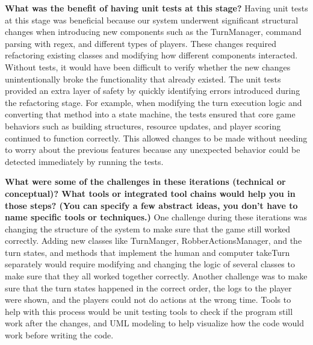 \textbf{What was the benefit of having unit tests at this stage?}
\newline\newline
Having unit tests at this stage was beneficial because our system underwent significant structural changes when introducing new components such as the TurnManager, command parsing with regex, and different types of players. These changes required refactoring existing classes and modifying how different components interacted. Without tests, it would have been difficult to verify whether the new changes unintentionally broke the functionality that already existed.
\newline \newline
The unit tests provided an extra layer of safety by quickly identifying errors introduced during the refactoring stage. For example, when modifying the turn execution logic and converting that method into a state machine, the tests ensured that core game behaviors such as building structures, resource updates, and player scoring continued to function correctly. This allowed changes to be made without needing to worry about the previous features because any unexpected behavior could be detected immediately by running the tests.
\newline

\textbf{What were some of the challenges in these iterations (technical or conceptual)? What tools or integrated tool chains would help you in those steps? (You can specify a few abstract ideas, you don’t have to name specific tools or techniques.)}
\newline\newline
One challenge during these iterations was changing the structure of the system to make sure that the game still worked correctly. Adding new classes like TurnManger, RobberActionsManager, and the turn states, and methods that implement the human and computer takeTurn separately would require modifying and changing the logic of several classes to make sure that they all worked together correctly. Another challenge was to make sure that the turn states happened in the correct order, the logs to the player were shown, and the players could not do actions at the wrong time. Tools to help with this process would be unit testing tools to check if the program still work after the changes, and UML modeling to help visualize how the code would work before writing the code.
\newline

